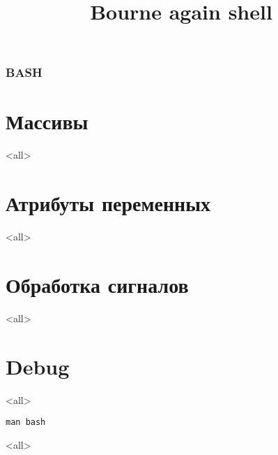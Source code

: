 
\title[bash]{Bourne again shell}




\begin{frame}
	\frametitle{BASH}
	\titlepage
	\vspace{-0.5cm}
	\begin{center}
	\end{center}
\end{frame}




\section{Массивы}

\mode<all>{}

\section{Атрибуты переменных}
\mode<all>{}

\section{Обработка сигналов}
\mode<all>{}

\section{Debug}
\mode<all>{}


\begin{frame}{}
\Huge
\begin{center}
	{\tt man bash}
\end{center}
\end{frame}

\mode<all>

